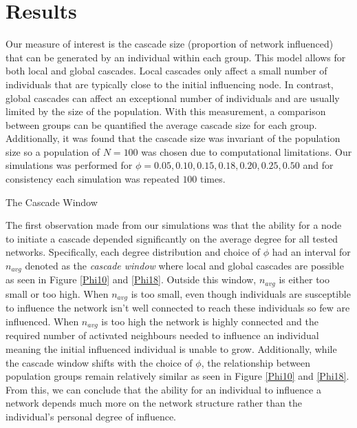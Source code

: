 \documentclass[10pt, oneside, reqno]{amsart}
\makeatletter
\theoremstyle{plain}%
\theoremstyle{definition}
\theoremstyle{remark}
\renewcommand\subsection{\@startsection{subsection}{2}%
  \z@{.5\linespacing\@plus.7\linespacing}{-.5em}%
  {\normalfont\scshape}}
\makeatother
\begin{document}
\section{Results}

Our measure of interest is the cascade size (proportion of network influenced) that can be generated by an individual within each group.
This model allows for both local and global cascades. 
Local cascades only affect a small number of individuals that are typically close to the initial influencing node. 
In contrast, global cascades can affect an exceptional number of individuals and are usually limited by the size of the population.
With this measurement, a comparison between groups can be quantified the average cascade size for each group.
Additionally, it was found that the cascade size was invariant of the population size so a population of $N=100$ was chosen due to computational limitations. Our simulations was performed for $\phi= 0.05,0.10,0.15,0.18,0.20,0.25,0.50$ and for consistency each simulation was repeated $100$ times.
 
\subsection{The Cascade Window}

The first observation made from our simulations was that the ability for a node to initiate a cascade depended significantly on the average degree for all tested networks.
Specifically, each degree distribution and choice of $\phi$ had an interval for $n_{avg}$ denoted as the \textit{cascade window} where local and global cascades are possible as seen in Figure \ref{Phi10} and \ref{Phi18}.
Outside this window, $n_{avg}$ is either too small or too high.
When $n_{avg}$ is too small, even though individuals are susceptible to influence the network isn't well connected to reach these individuals so few are influenced.
When $n_{avg}$ is too high the network is highly connected and the required number of activated neighbours needed to influence an individual meaning the initial influenced individual is unable to grow.
Additionally, while the cascade window shifts with the choice of $\phi$, the relationship between population groups remain relatively similar as seen in Figure \ref{Phi10} and \ref{Phi18}.
From this, we can conclude that the ability for an individual to influence a network depends much more on the network structure rather than the individual's personal degree of influence.


\end{document}
